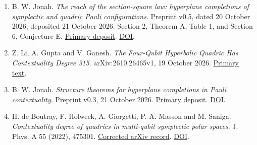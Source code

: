 \documentclass[11pt,letterpaper]{article}
\providecommand{\tightlist}{\setlength{\itemsep}{0pt}\setlength{\parskip}{0pt}}
\begin{document}
\begin{enumerate}
\def\labelenumi{\arabic{enumi}.}
\tightlist
\item
  B. W. Jonah. \emph{The reach of the section-square law: hyperplane completions of symplectic and quadric Pauli configurations}. Preprint v0.5, dated 20 October 2026; deposited 21 October 2026. Section 2, Theorem A, Table 1, and Section 6, Conjecture E. \href{https://zenodo.org/records/23524332}{Primary deposit}. \href{https://doi.org/10.5281/zenodo.23524332}{DOI}.
\item
  Z. Li, A. Gupta and V. Ganesh. \emph{The Four-Qubit Hyperbolic Quadric Has Contextuality Degree 315}. arXiv:2610.26465v1, 19 October 2026. \href{https://arxiv.org/html/2610.26465v1}{Primary text}.
\item
  B. W. Jonah. \emph{Structure theorems for hyperplane completions in Pauli contextuality}. Preprint v0.3, 21 October 2026. \href{https://zenodo.org/records/23538829}{Primary deposit}. \href{https://doi.org/10.5281/zenodo.23538829}{DOI}.
\item
  H. de Boutray, F. Holweck, A. Giorgetti, P.-A. Masson and M. Saniga. \emph{Contextuality degree of quadrics in multi-qubit symplectic polar spaces}. J. Phys. A 55 (2022), 475301. \href{https://arxiv.org/abs/2105.13798}{Corrected arXiv record}. \href{https://doi.org/10.1088/1751-8121/aca36f}{DOI}.
\end{enumerate}
\end{document}
